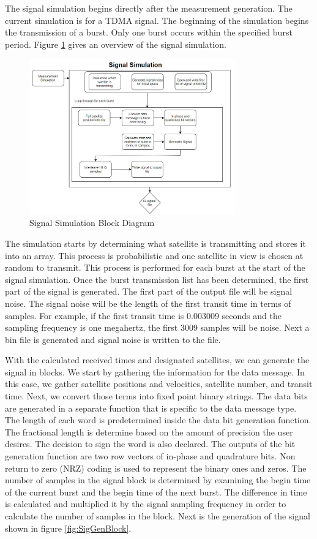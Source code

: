 \documentclass[12pt]{report}
\begin{document}
The signal simulation begins directly after the measurement generation. The current simulation is for a TDMA signal. The beginning of the simulation begins the transmission of a burst. Only one burst occurs within the specified burst period. Figure \ref{fig:SigSimBlock} gives an overview of the signal simulation.

\begin{figure}[h]
    \centering
    \includegraphics[width=3.5in]{SignalSimBlock}
    \caption{Signal Simulation Block Diagram}
    \label{fig:SigSimBlock}
\end{figure}


The simulation starts by determining what satellite is transmitting and stores it into an array. This process is probabilistic and one satellite in view is chosen at random to transmit. This process is performed for each burst at the start of the signal simulation. Once the burst transmission list has been determined, the first part of the signal is generated. The first part of the output file will be signal noise. The signal noise will be the length of the first transit time in terms of samples. For example, if the first transit time is 0.003009 seconds and the sampling frequency is one megahertz, the first 3009 samples will be noise. Next a bin file is generated and signal noise is written to the file. 

With the calculated received times and designated satellites, we can generate the signal in blocks. We start by gathering the information for the data message. In this case, we gather satellite positions and velocities, satellite number, and transit time. Next, we convert those terms into fixed point binary strings. The data bits are generated in a separate function that is specific to the data message type. The length of each word is predetermined inside the data bit generation function.  The fractional length is determine based on the amount of precision the user desires. The decision to sign the word is also declared.  The outputs of the bit generation function are two row vectors of in-phase and quadrature bits. Non return to zero (NRZ) coding is used to represent the binary ones and zeros. The number of samples in the signal block is determined by examining the begin time of the current burst and the begin time of the next burst. The difference in time is calculated and multiplied it by the signal sampling frequency in order to calculate the number of samples in the block. Next is the generation of the signal shown in figure \ref{fig:SigGenBlock}. 
\end{document}
